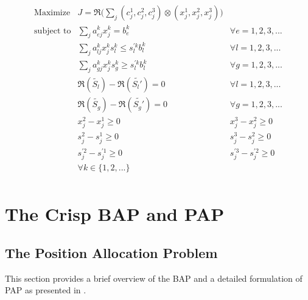 \documentclass[11pt,a4paper,final]{article}
\begin{document}
\begin{equation}
\label{eq:kumar-kaurs-crisp}
\begin{array}{lll}
\text{Maximize}    & J = \mathfrak{R}\Big(\sum_j (c_j^1,c_j^2,c_j^3) \otimes (x_j^1,x_j^2,x_j^3)\Big) &                       \\
\text{subject to}  & \sum_j a_{ej}^k x_j^k = b_e^k                                   &  \forall e = 1,2,3,...      \\
                   & \sum_j a_{lj}^k x_j^k s_l^k \le s_l^{'k} b_l^k                    &  \forall l = 1,2,3,...      \\
                   & \sum_j a_{gj}^k x_j^k s_g^k \ge s_l^{'k} b_l^k                    &  \forall g = 1,2,3,...      \\
                   & \mathfrak{R}(\tilde{S_l}) - \mathfrak{R}(\tilde{S_l'}) = 0                         & \forall l = 1,2,3,...       \\
                   & \mathfrak{R}(\tilde{S_g}) - \mathfrak{R}(\tilde{S_g'}) = 0                         & \forall g = 1,2,3,...       \\
                   & x_j^2 - x_j^1 \ge 0                                            & x_j^3 - x_j^2 \ge 0     \\
                   & s_j^2 - s_j^1 \ge 0                                            & s_j^3 - s_j^2 \ge 0     \\
                   & s_j^{'2} - s_j^{'1} \ge 0                                      & s_j^{'3} - s_j^{'2} \ge 0 \\
                   & \forall k \in \{1,2,...\}                                            &                       \\
\end{array}
\end{equation}

\section{The Crisp BAP and PAP}
\label{sec:org17815b6}
\subsection{The Position Allocation Problem}
\label{sec:positionallocationproblem}
This section provides a brief overview of the BAP and a detailed formulation of PAP as presented in \cite{Qarebagh2019}.
\end{document}
